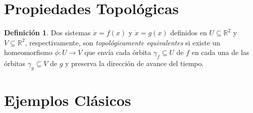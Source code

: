 \documentclass[11pt]{book}
\theoremstyle{definition}
\newtheorem{definition}{Definición}
\numberwithin{definition}{section}
\theoremstyle{theorem}
\numberwithin{theorem}{section}
\numberwithin{lemma}{section}
\numberwithin{corollary}{section}
\theoremstyle{plain}
\numberwithin{example}{section}
\newcommand{\R}{{\ensuremath{\mathbb{R}}}}
\begin{document}
\section{Propiedades Topológicas}

\begin{definition}Dos sistemas $\dot{x} = f(x)$ y $\dot{x} = g(x)$ definidos en $U \subseteq \R^2$ y $V \subseteq \R^2$, respectivamente, son \emph{topológicamente equivalentes} si existe un homeomorfismo $\phi : U \to V$ que envía cada órbita $\gamma_f \subseteq U$ de $f$ en cada una de las órbitas $\gamma_g \subseteq V$ de $g$ y preserva la dirección de avance del tiempo.
\end{definition}


\section{Ejemplos Clásicos}

\end{document}
